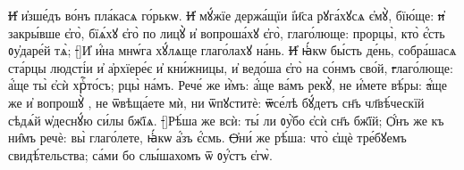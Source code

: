 \st{И҆} и҆зше́дъ во́нъ пла́касѧ го́рькѡ.
\st{И҆} мꙋ́жїе держа́щїи і҆и҃са рꙋга́хꙋсѧ є҆мꙋ̀, бїю́ще:
\st{и҆} закры́вше є҆го̀, бїѧ́хꙋ є҆го̀ по лицꙋ̀ и҆ вопроша́хꙋ є҆го̀, глаго́люще: прорцы̀, кто̀ є҆́сть ᲂу҆даре́й тѧ̀;
\st[]{И҆} и҆́на мнѡ́га хꙋ́лѧще глаго́лахꙋ на́нь.
\st{И҆} ꙗ҆́кѡ бы́сть де́нь, собра́шасѧ ста́рцы людсті́и и҆ а҆рхїере́є и҆ кни́жницы, и҆ ведо́ша є҆го̀ на со́нмъ сво́й,
\st{г}лаго́люще: а҆́ще ты̀ є҆сѝ хрⷭ҇то́съ; рцы̀ на́мъ. Рече́ же и҆̀мъ: а҆́ще ва́мъ рекꙋ̀, не и҆́мете вѣ́ры:
\st{а҆́}ще же и҆ вопрошꙋ̀ , не ѿвѣща́ете мѝ, ни ѿпꙋститѐ:
\st{ѿ}се́лѣ бꙋ́детъ сн҃ъ чл҃вѣ́ческїй сѣдѧ́й ѡ҆деснꙋ́ю си́лы бж҃їѧ.
\st[]{Р}ѣ́ша же всѝ: ты́ ли ᲂу҆̀бо є҆сѝ сн҃ъ бж҃їй; Ѻ҆́нъ же къ ни̑мъ речѐ: вы̀ глаго́лете, ꙗ҆́кѡ а҆́зъ є҆́смь.
\st{Ѻ҆}ни́ же рѣ́ша: что̀ є҆щѐ тре́бꙋемъ свидѣ́тельства; са́ми бо слы́шахомъ ѿ ᲂу҆́стъ є҆гѡ̀.



\vskip-6pt
